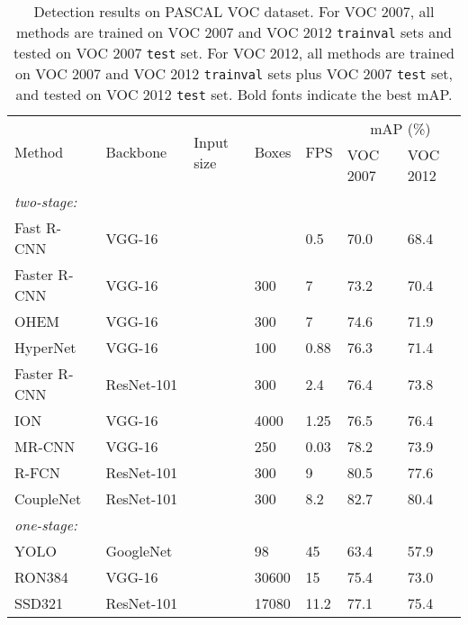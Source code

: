 \documentclass[10pt,twocolumn,letterpaper]{article}
\begin{document}
\begin{table*}[t]
\centering
\caption{Detection results on PASCAL VOC dataset. For VOC 2007, all methods are trained on VOC 2007 and VOC 2012 {\tt trainval} sets and tested on VOC 2007 {\tt test} set. For VOC 2012, all methods are trained on VOC 2007 and VOC 2012 {\tt trainval} sets plus VOC 2007 {\tt test} set, and tested on VOC 2012 {\tt test} set. Bold fonts indicate the best mAP.}
\footnotesize \setlength{\tabcolsep}{2.5pt}
\begin{tabular}{p{3.0cm}<{\centering}|p{3.0cm}<{\centering}|p{2.5cm}<{\centering}|p{1.5cm}<{\centering}|p{1.5cm}<{\centering}|p{2.2cm}<{\centering}|p{2.2cm}<{\centering}}
\toprule[1.5pt]
\multirow{2}{*}{Method} &\multirow{2}{*}{Backbone} &\multirow{2}{*}{Input size} &\multirow{2}{*}{Boxes} &\multirow{2}{*}{FPS} &\multicolumn{2}{c}{mAP (\%)} \\
\cline{6-7}
& & & & &VOC 2007 &VOC 2012 \\
\hline
\textit{two-stage:} & & & & & &\\
Fast R-CNN\cite{DBLP:conf/iccv/Girshick15}     &VGG-16 & & &0.5 &70.0 &68.4\\
Faster R-CNN\cite{DBLP:journals/pami/RenHG017} &VGG-16 & &300 &7 &73.2 &70.4\\
OHEM\cite{DBLP:conf/cvpr/ShrivastavaGG16}      &VGG-16 & &300 &7 &74.6 &71.9\\
HyperNet\cite{DBLP:conf/cvpr/KongYCS16}        &VGG-16 & &100 &0.88 &76.3 &71.4\\
Faster R-CNN\cite{DBLP:journals/pami/RenHG017} &ResNet-101 & &300 &2.4 &76.4 & 73.8\\
ION\cite{DBLP:conf/cvpr/BellZBG16}             &VGG-16 & &4000 &1.25 &76.5 &76.4\\
MR-CNN\cite{DBLP:conf/iccv/GidarisK15}         &VGG-16 & &250 &0.03 &78.2 &73.9\\
R-FCN\cite{DBLP:conf/nips/DaiLHS16}            &ResNet-101 & &300 &9 &80.5 &77.6\\
CoupleNet\cite{DBLP:conf/iccv/abs-1708-02863}  &ResNet-101 & &300 &8.2 &82.7 &80.4\\
\hline
\hline
\textit{one-stage:} & & & & & &\\
YOLO\cite{DBLP:conf/cvpr/RedmonDGF16}       &GoogleNet~\cite{DBLP:conf/cvpr/SzegedyLJSRAEVR15} & &98 &45 &63.4 &57.9\\
RON384\cite{DBLP:conf/cvpr/KongSYLLC17}     &VGG-16 & &30600 &15 &75.4 &73.0\\
SSD321\cite{DBLP:journals/corr/FuLRTB17}    &ResNet-101 & &17080 &11.2 &77.1 &75.4\\

\end{tabular}
\end{table*}
\end{document}
